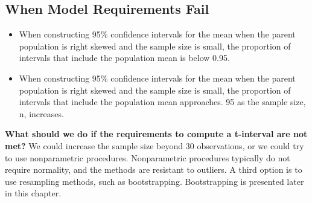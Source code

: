 \documentclass{report}
\begin{document}
    \subsection*{When Model Requirements Fail}
    \bigbreak \noindent 
    \begin{itemize}
      \item When constructing 95\% confidence intervals for the mean when the parent population is right skewed and the sample size is​ small, the proportion of intervals that include the population mean is below 0.95.
      \item When constructing 95\% confidence intervals for the mean when the parent population is right skewed and the sample size is​ small, the proportion of intervals that include the population mean approaches. 95 as the sample​ size, n, increases.
    \end{itemize}
    \bigbreak \noindent 
    \textbf{What should we do if the requirements to compute a t-interval are not met?}
    \bigbreak \noindent 
    We could increase the sample size beyond 30 observations, or we could try to use nonparametric procedures. Nonparametric procedures typically do not require normality, and the methods are resistant to outliers. A third option is to use resampling methods, such as bootstrapping. Bootstrapping is presented later in this chapter.

\end{document}
